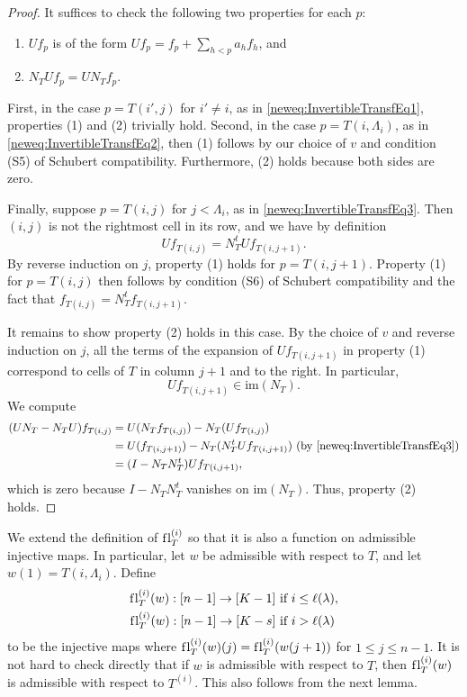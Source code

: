 \documentclass[11pt]{amsart}
\theoremstyle{definition}
\newcommand{\fl}{\mathrm{f\hspace{0.25pt}l}}
\begin{document}
\begin{proof}
It suffices to check the following two properties for each $p$:
\begin{enumerate}
    \item $Uf_p$ is of the form $Uf_p = f_p + \sum_{h< p} a_h f_h$, and
    \item $N_TUf_p = UN_Tf_p$.
\end{enumerate}
First, in the case $p = T(i',j)$ for $i'\neq i$, as in \eqref{neweq:InvertibleTransfEq1}, properties (1) and (2) trivially hold. Second, in the case $p=T(i,\Lambda_i)$, as in \eqref{neweq:InvertibleTransfEq2}, then (1) follows by our choice of $v$ and condition (S5) of Schubert compatibility. Furthermore, (2) holds because both sides are zero.

Finally, suppose $p = T(i,j)$ for $j<\Lambda_i$, as in \eqref{neweq:InvertibleTransfEq3}. Then $(i, j)$ is not the rightmost cell in its row, and we have by definition
\begin{equation}
Uf_{T(i, j)} = N_T^t U f_{T(i, j+1)}.
\end{equation}
By reverse induction on $j$, property (1) holds for $p=T(i,j+1)$. Property (1) for $p=T(i,j)$ then follows by condition (S6) of Schubert compatibility and the fact that $f_{T(i, j)} = N_T^t f_{T(i, j+1)}$.

It remains to show property (2) holds in this case. By the choice of $v$ and reverse induction on $j$, all the terms of the expansion of $Uf_{T(i,j+1)}$ in property (1) correspond to cells of $T$ in column $j+1$ and to the right. In particular,
\begin{equation} \label{eq:column j+1}
U f_{T(i, j+1)} \in \mathrm{im}(N_T).
\end{equation}
We compute
\begin{align}
    (UN_T - N_TU)f_{T(i, j)} &= U(N_Tf_{T(i, j)}) - N_T (U f_{T(i, j)}) \\
    &= U (f_{T(i, j+1)}) - N_T (N_T^t U f_{T(i, j+1)}) \text{ (by \eqref{neweq:InvertibleTransfEq3})}\\
    &= (I - N_TN_T^t) U f_{T(i, j+1)},
\end{align}
which is zero because $I - N_T N_T^t$ vanishes on $\mathrm{im}(N_T)$. Thus, property (2) holds.
\end{proof}

We extend the definition of $\fl_T^{(i)}$ so that it is also a function on admissible injective maps.  In particular, let $w$ be admissible with respect to $T$, and let $w(1) = T(i, \Lambda_i)$. Define 
\begin{align}
    \fl_T^{(i)}(w): [n-1] \rightarrow [K-1] & \text{ if } i\leq \ell(\lambda),\\
    \fl_T^{(i)}(w): [n-1] \rightarrow [K-s] & \text{ if } i>\ell(\lambda)
\end{align}
to be the injective maps where $\fl_T^{(i)}(w)(j)= \fl_T^{(i)}(w(j+1))$ for $1\leq j\leq n-1$.
It is not hard to check directly that if $w$ is admissible with respect to $T$, then $\fl_T^{(i)}(w)$ is admissible with respect to $T^{(i)}$. This also follows from the next lemma.
\end{document}
